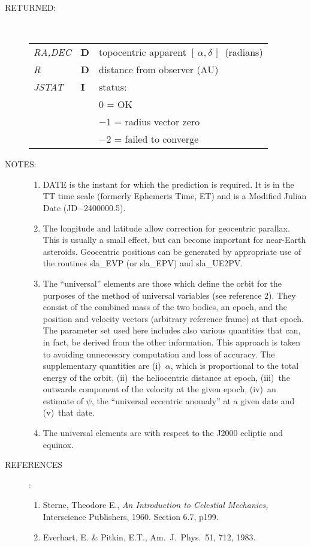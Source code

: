 \documentclass[11pt,twoside]{article}
\newcommand{\radec}     {$[\,\alpha,\delta\,]$}
\newlength{\oldspacing}
\newcommand{\args}[2]
{
  \goodbreak
  \setlength{\oldspacing}{\topsep}
  \setlength{\topsep}{0.3ex}
  \begin{description}
  \item[#1]:\\[1.5ex]
    \begin{tabular}{p{7em}p{6em}p{22em}}
      #2
    \end{tabular}
  \end{description}
  \setlength{\topsep}{\oldspacing}
}
\renewcommand{\args}[2]
   {
     \begin{description}
        \item[#1:]\\
        \begin{tabular}{p{7em}p{6em}l}
           #2
        \end{tabular}
     \end{description}
   }
\newcommand{\spec}[3]
{
  {\em {#1}} & {\bf \mbox{#2}} & {#3}
}
\newcommand{\notes}[1]
{
  \goodbreak
  \setlength{\oldspacing}{\topsep}
  \setlength{\topsep}{0.3ex}
  \begin{description}
    \item[NOTES]:
        #1
  \end{description}
  \setlength{\topsep}{\oldspacing}
}
\renewcommand{\notes}[1]
   {
      \begin{description}
         \item[NOTES:]
            #1
      \end{description}
   }
\newcommand{\refs}[1]
{
  \goodbreak
  \setlength{\oldspacing}{\topsep}
  \setlength{\topsep}{0.3ex}
  \begin{description}
    \item[REFERENCES]:
        #1
  \end{description}
  \setlength{\topsep}{\oldspacing}
}
\newcommand{\refs}[1]
   {
     \begin{description}
       \item[REFERENCES:]
           #1
     \end{description}
   }
\begin{document}
\args{RETURNED}
{
 \spec{RA,DEC}{D}{topocentric apparent \radec\ (radians)} \\
 \spec{R}{D}{distance from observer (AU)} \\
 \spec{JSTAT}{I}{status:} \\
 \spec{}{}{\hspace{2.3em}    0 = OK} \\
 \spec{}{}{\hspace{1.5em} $-$1 = radius vector zero} \\
 \spec{}{}{\hspace{1.5em} $-$2 = failed to converge}
}
\notes
{
 \begin{enumerate}
  \item DATE is the instant for which the prediction is
        required.  It is in the TT time scale (formerly
        Ephemeris Time, ET) and is a
        Modified Julian Date (JD$-$2400000.5).
  \item The longitude and latitude allow correction for geocentric
        parallax.  This is usually a small effect, but can become
        important for near-Earth asteroids.  Geocentric positions
        can be generated by appropriate use of the routines
        sla\_EVP (or sla\_EPV) and sla\_UE2PV.
  \item The ``universal'' elements are those which define the orbit for the
        purposes of the method of universal variables (see reference 2).
        They consist of the combined mass of the two bodies, an epoch,
        and the position and velocity vectors (arbitrary reference frame)
        at that epoch.  The parameter set used here includes also various
        quantities that can, in fact, be derived from the other
        information.  This approach is taken to avoiding unnecessary
        computation and loss of accuracy.  The supplementary quantities
        are (i)~$\alpha$, which is proportional to the total energy of the
        orbit, (ii)~the heliocentric distance at epoch,
        (iii)~the outwards component of the velocity at the given epoch,
        (iv)~an estimate of $\psi$, the ``universal eccentric anomaly'' at a
        given date and (v)~that date.
  \item The universal elements are with respect to the J2000 ecliptic
        and equinox.
 \end{enumerate}
}
\refs{
   \begin{enumerate}
   \item Sterne, Theodore E., {\it An Introduction to Celestial Mechanics,}\/
         Interscience Publishers, 1960.  Section 6.7, p199.
   \item Everhart, E. \& Pitkin, E.T., Am.~J.~Phys.~51, 712, 1983.
   \end{enumerate}
}
\end{document}
